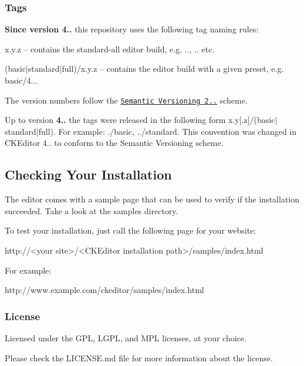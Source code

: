 \subsubsection*{Tags}

{\bfseries Since version 4..} this repository uses the following tag naming rules\+:


\begin{DoxyItemize}
\item {\ttfamily x.\+y.\+z} -- contains the {\ttfamily standard-\/all} editor build, e.\+g. {..}, {..} etc.
\item {\ttfamily (basic$\vert$standard$\vert$full)/x.y.\+z} -- contains the editor build with a given preset, e.\+g. {\ttfamily basic/4..}.
\end{DoxyItemize}

The version numbers follow the \href{http://semver.org/}{\tt Semantic Versioning 2..} scheme.

Up to version {\bfseries 4..} the tags were released in the following form {\ttfamily x.\+y\mbox{[}.z\mbox{]}/(basic$\vert$standard$\vert$full)}. For example\+: {./basic}, {../standard}. This convention was changed in C\+K\+Editor 4.. to conform to the Semantic Versioning scheme.

\subsection*{Checking Your Installation}

The editor comes with a sample page that can be used to verify if the installation succeeded. Take a look at the {\ttfamily samples} directory.

To test your installation, just call the following page for your website\+: \begin{DoxyVerb}http://<your site>/<CKEditor installation path>/samples/index.html
\end{DoxyVerb}


For example\+: \begin{DoxyVerb}http://www.example.com/ckeditor/samples/index.html
\end{DoxyVerb}


\subsubsection*{License}

Licensed under the G\+PL, L\+G\+PL, and M\+PL licenses, at your choice.

Please check the {\ttfamily L\+I\+C\+E\+N\+S\+E.\+md} file for more information about the license. 